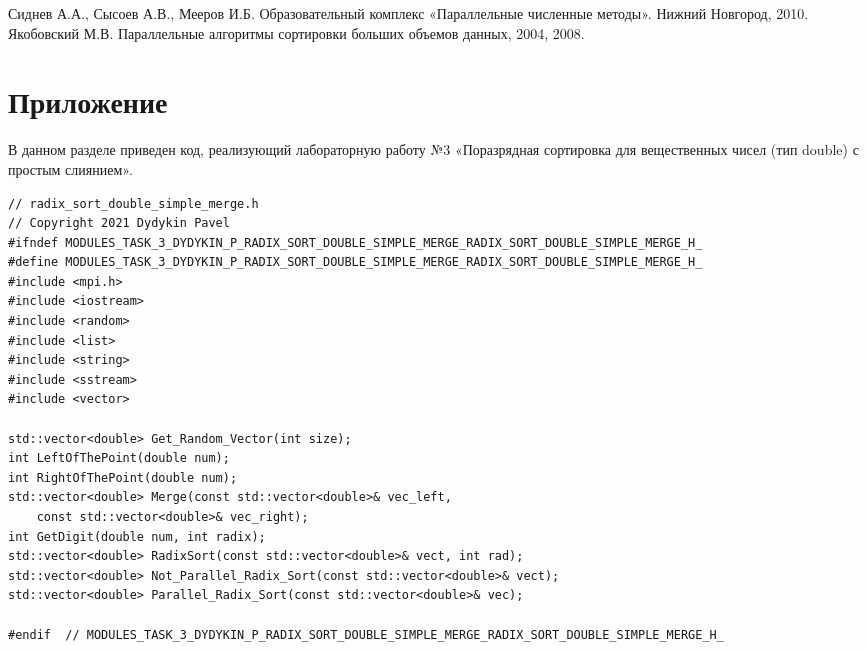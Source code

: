 \documentclass[12pt]{report}
\begin{document}
\begin{thebibliography}{1}
Сиднев А.А., Сысоев А.В., Мееров И.Б. Образовательный комплекс
«Параллельные численные методы». Нижний Новгород, 2010.
Якобовский М.В. Параллельные алгоритмы сортировки больших объемов данных, 2004, 2008.
\end{thebibliography}
\newpage

\section*{Приложение}
В данном разделе приведен код, реализующий лабораторную работу №3 «Поразрядная сортировка для вещественных чисел (тип double) с простым слиянием».


\begin{lstlisting}
// radix_sort_double_simple_merge.h
// Copyright 2021 Dydykin Pavel
#ifndef MODULES_TASK_3_DYDYKIN_P_RADIX_SORT_DOUBLE_SIMPLE_MERGE_RADIX_SORT_DOUBLE_SIMPLE_MERGE_H_
#define MODULES_TASK_3_DYDYKIN_P_RADIX_SORT_DOUBLE_SIMPLE_MERGE_RADIX_SORT_DOUBLE_SIMPLE_MERGE_H_
#include <mpi.h>
#include <iostream>
#include <random>
#include <list>
#include <string>
#include <sstream>
#include <vector>

std::vector<double> Get_Random_Vector(int size);
int LeftOfThePoint(double num);
int RightOfThePoint(double num);
std::vector<double> Merge(const std::vector<double>& vec_left,
    const std::vector<double>& vec_right);
int GetDigit(double num, int radix);
std::vector<double> RadixSort(const std::vector<double>& vect, int rad);
std::vector<double> Not_Parallel_Radix_Sort(const std::vector<double>& vect);
std::vector<double> Parallel_Radix_Sort(const std::vector<double>& vec);

#endif  // MODULES_TASK_3_DYDYKIN_P_RADIX_SORT_DOUBLE_SIMPLE_MERGE_RADIX_SORT_DOUBLE_SIMPLE_MERGE_H_
\end{lstlisting}
\end{document}
